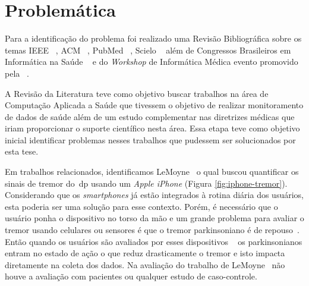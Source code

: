



\section{Problemática}\label{section:problematica}
Para a identificação do problema foi realizado uma Revisão Bibliográfica sobre os temas IEEE ~\cite{ieee}, ACM ~\cite{acm}, PubMed ~\cite{pubmed}, Scielo ~\cite{scielo} além de Congressos Brasileiros em Informática na Saúde ~\cite{cbis} e do \textit{Workshop} de Informática Médica evento promovido pela ~\cite{sbc}.

A Revisão da Literatura teve como objetivo buscar trabalhos na área de Computação Aplicada a Saúde que tivessem o objetivo de realizar monitoramento de dados de saúde além de um estudo complementar nas diretrizes médicas que iriam proporcionar o suporte científico nesta área. Essa etapa teve como objetivo inicial identificar problemas nesses trabalhos que pudessem ser solucionados por esta tese.

Em trabalhos relacionados, identificamos LeMoyne~\cite{lemoyne2010} o qual buscou quantificar os sinais de tremor do~\ac{dp} usando um \textit{Apple iPhone} (Figura \ref{fig:iphone-tremor}). Considerando que os \textit{smartphones} já estão integrados à rotina diária dos usuários, esta poderia ser uma solução para esse contexto. Porém, é necessário que o usuário ponha o dispositivo no torso da mão e um grande problema para avaliar o tremor usando celulares ou sensores é que o tremor parkinsoniano é de repouso~\cite{jankovic2008}. Então quando os usuários são avaliados por esses dispositivos ~\cite{lemoyne2010,synnott_wiipd_2012} os parkinsonianos entram no estado de ação o que reduz drasticamente o tremor e isto impacta diretamente na coleta dos dados. Na avaliação do trabalho de LeMoyne~\cite{lemoyne2010} não houve a avaliação com pacientes ou qualquer estudo de caso-controle. %


